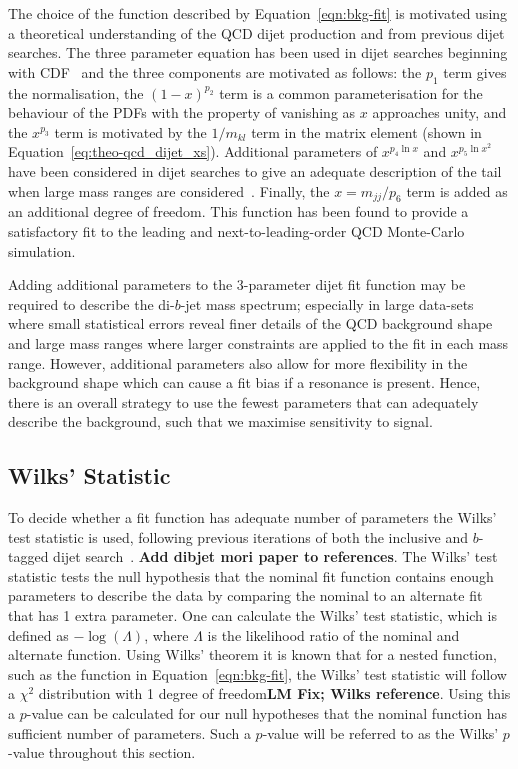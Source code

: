 The choice of the function described by Equation~\ref{eqn:bkg-fit}
is motivated using a theoretical understanding of the QCD dijet production
and from previous dijet searches.
The three parameter equation has been used in dijet searches beginning with CDF~\cite{dijet-CDF_3par}
and the three components are motivated as follows:
the $p_1$ term gives the normalisation,
the $(1-x)^{p_2}$ term is a common parameterisation for the behaviour of the PDFs with the property of vanishing as $x$ approaches unity,
and the $x^{p_3}$ term is motivated by the $1/m_{kl}$ term in the matrix element (shown in Equation~\ref{eq:theo-qcd_dijet_xs}).
Additional parameters of $x^{p_4\ln{x}}$ and $x^{p_5\ln{x}^{2}}$ have been considered in dijet searches to give an adequate description of the tail
when large mass ranges are considered~\cite{dijet-CDF_4par,dijet-mori16_int}.
Finally, the $x=m_{jj}/p_6$ term is added as an additional degree of freedom.
This function has been found to provide a satisfactory fit to the leading and next-to-leading-order QCD Monte-Carlo simulation.

Adding additional parameters to the 3-parameter dijet fit function may be required to describe the di-$b$-jet mass spectrum;
especially in large data-sets where small statistical errors reveal finer details of the QCD background shape
and large mass ranges where larger constraints are applied to the fit in each mass range.
However, additional parameters also allow for more flexibility in the background shape
which can cause a fit bias if a resonance is present.
Hence, there is an overall strategy to use the fewest parameters
that can adequately describe the background,
such that we maximise sensitivity to signal.

\subsection{Wilks' Statistic}
\label{sec:bkg-bkg_wilks}

To decide whether a fit function has adequate number of parameters the Wilks' test statistic is used,
following previous iterations of both the inclusive and $b$-tagged dijet search~\cite{dijet-mori16_paper,dibjet-mori16_paper}.
\textbf{Add dibjet mori paper to references}.
The Wilks' test statistic tests the null hypothesis that the nominal fit function contains enough parameters to describe the data
by comparing the nominal to an alternate fit that has 1 extra parameter.
One can calculate the Wilks' test statistic, which is defined as $-\log{(\Lambda)}$, where $\Lambda$ is the likelihood ratio of the nominal and alternate function.
Using Wilks' theorem it is known that for a nested function, such as the function in Equation~\ref{eqn:bkg-fit},
the Wilks' test statistic will follow a $\chi^2$ distribution with 1 degree of freedom\textbf{LM Fix; Wilks reference}.
Using this a $p$-value can be calculated for our null hypotheses that the nominal function has sufficient number of parameters.
Such a $p$-value will be referred to as the Wilks' $p$-value throughout this section.


